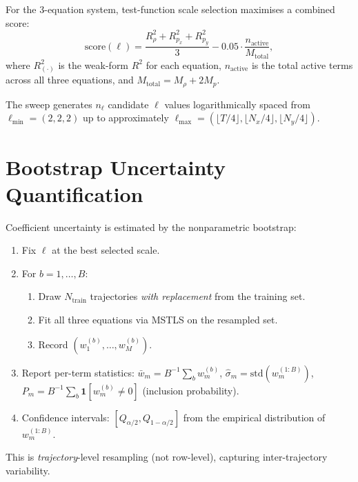 \documentclass[11pt, letterpaper]{article}
\theoremstyle{definition}
\begin{document}
For the 3-equation system, test-function scale selection maximises a
combined score:
\begin{equation}
\label{eq:multifield-score}
  \text{score}(\bm\ell)
  = \frac{R^{2}_{\rho} + R^{2}_{p_x} + R^{2}_{p_y}}{3}
  - 0.05 \cdot \frac{n_{\mathrm{active}}}{M_{\mathrm{total}}},
\end{equation}
where $R^{2}_{(\cdot)}$ is the weak-form $R^{2}$ for each equation,
$n_{\mathrm{active}}$ is the total active terms across all three
equations, and $M_{\mathrm{total}} = M_{\rho} + 2M_p$.

The sweep generates $n_{\ell}$ candidate $\bm\ell$ values
logarithmically spaced from $\bm\ell_{\min} = (2,2,2)$ up to
approximately
$\bm\ell_{\max} = (\lfloor T/4\rfloor, \lfloor N_x/4\rfloor,
\lfloor N_y/4\rfloor)$.

\section{Bootstrap Uncertainty Quantification}
\label{sec:bootstrap}

Coefficient uncertainty is estimated by the nonparametric bootstrap:

\begin{enumerate}[nosep]
  \item Fix $\bm\ell$ at the best selected scale.
  \item For $b = 1, \dots, B$:
  \begin{enumerate}[nosep]
    \item Draw $N_{\mathrm{train}}$ trajectories \emph{with replacement}
      from the training set.
    \item Fit all three equations via MSTLS on the resampled set.
    \item Record $(w_1^{(b)}, \dots, w_M^{(b)})$.
  \end{enumerate}
  \item Report per-term statistics:
  $\bar{w}_m = B^{-1}\sum_b w_m^{(b)}$, \;
  $\hat\sigma_m = \mathrm{std}(w_m^{(1:B)})$, \;
  $P_m = B^{-1}\sum_b \mathbf{1}[w_m^{(b)} \ne 0]$ (inclusion probability).
  \item Confidence intervals:
  $[Q_{\alpha/2}, Q_{1-\alpha/2}]$ from the empirical distribution
  of $w_m^{(1:B)}$.
\end{enumerate}

This is \emph{trajectory}-level resampling (not row-level), capturing
inter-trajectory variability.
\end{document}
